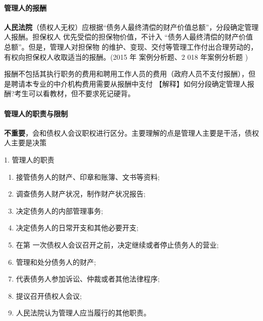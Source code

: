 \documentclass[UTF8,12pt]{ctexart}
\numberwithin{equation}{section} %
\numberwithin{figure}{section}
\numberwithin{table}{section}
\begin{document}
	\paragraph{管理人的报酬}
	
	\textbf{人民法院}（债权人无权）应根据“债务人最终清偿的财产价值总额”，分段确定管理人报酬。担保权人 优先受偿的担保物价值，不计入 “债务人最终清偿的财产价值总额”。但是，管理人对担保物 的维护、变现、交付等管理工作付出合理劳动的，有权向担保权人收取适当的报酬。(2015 年 案例分析题、2 018 年案例分析题 )
	
	报酬不包括其执行职务的费用和聘用工作人员的费用（政府人员不支付报酬），但是聘请本专业的中介机构费用需要从报酬中支付
	【解释】如何分段确定管理人报酬?考生可以看教材，但不要求死记硬背。
	
	\paragraph{管理人的职责与限制}
	\textbf{不重要}，会和债权人会议职权进行区分。主要理解的点是管理人主要是干活，债权人主要是决策
	
	1. 管理人的职责
	\begin{enumerate}
		\item 接管债务人的财产、印章和账簿、文书等资料;
		
		\item 调查债务人财产状况，制作财产状况报告;
		
		\item 决定债务人的内部管理事务;
		
		\item 决定债务人的日常开支和其他必要开支;
		
		\item 在第 一次债权人会议召开之前，决定继续或者停止债务人的营业;
		
		\item 管理和处分债务人的财产;
		
		\item 代表债务人参加诉讼、仲裁或者其他法律程序;
		
		\item 提议召开债权人会议;
		
		\item 人民法院认为管理人应当履行的其他职责。
	\end{enumerate}
	
\end{document}
